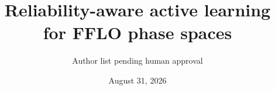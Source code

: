 \documentclass[aps,prl,reprint,superscriptaddress,floatfix]{revtex4-2}
\begin{document}
\title{Reliability-aware active learning for FFLO phase spaces}
\author{Author list pending human approval}
\date{August 31, 2026}
\begin{abstract}

\end{abstract}
\maketitle





\end{document}
